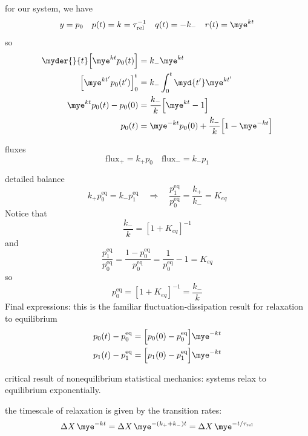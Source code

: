 \documentclass[twocolumn]{notes}
\begin{document}
\begin{itemizec}
    \item for our system, we have
    \[
        y = p_0 \quad p(t) = k = \tau_\mathrm{rel}^{-1} \quad q(t) = -k_-
        \quad r(t) = \mye^{kt}
    \]
    so
    \begin{align*}
        \myder{}{t}\Big[\mye^{kt}p_0(t)\Big] &= k_- \mye^{kt} \\
        \Big[\mye^{kt'}p_0(t')\Big]_0^t &= k_- \int_0^t\myd{t'}\mye^{kt'} \\
        \mye^{kt}p_0(t) - p_0(0) &= \frac{k_-}{k}\Big[\mye^{kt} - 1\Big] \\
        p_0(t) &= \mye^{-kt}p_0(0) + \frac{k_-}{k}\Big[1 - \mye^{-kt}\Big]
    \end{align*}
    \item fluxes
    \[
        \mathrm{flux}_+ = k_+p_0 \quad \mathrm{flux}_- = k_-p_1
    \]
    \item detailed balance
    \[
        k_+p_0^\mathrm{eq} = k_-p_1^\mathrm{eq} \quad\Rightarrow\quad
        \frac{p_1^\mathrm{eq}}{p_0^\mathrm{eq}} = \frac{k_+}{k_-} = K_{eq}
    \]
    Notice that
    \[
        \frac{k_-}{k} = [1 + K_{eq}]^{-1}
    \]
    and
    \[
        \frac{p_1^\mathrm{eq}}{p_0^\mathrm{eq}}
        = \frac{1 - p_0^\mathrm{eq}}{p_0^\mathrm{eq}}
        = \frac{1}{p_0^\mathrm{eq}} - 1 = K_{eq}
    \]
    so
    \[
        p_0^\mathrm{eq} = [1 + K_{eq}]^{-1} = \frac{k_-}{k}
    \]
    Final expressions:  this is the familiar fluctuation-dissipation result for relaxation to equilibrium
    \begin{align*}
        p_0(t) - p_0^\mathrm{eq}
        &= \Big[p_0(0) - p_0^\mathrm{eq}\Big]\mye^{-kt} \\
        p_1(t) - p_1^\mathrm{eq}
        &= \Big[p_1(0) - p_1^\mathrm{eq}\Big]\mye^{-kt}
    \end{align*}
    \item critical result of nonequilibrium statistical mechanics:  systems relax to equilibrium exponentially.
    \item the timescale of relaxation is given by the transition rates:
    \[
        \Delta X\,\mye^{-kt} = \Delta X\,\mye^{-(k_+ + k_-)t}
        = \Delta X\,\mye^{-t/\tau_\mathrm{rel}}
    \]
\end{itemizec}
\end{document}
